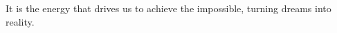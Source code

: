 \documentclass[preview]{standalone}
\begin{document}
\begin{center}
It is the energy that drives us to achieve the impossible, turning dreams into reality.
\end{center}
\end{document}
